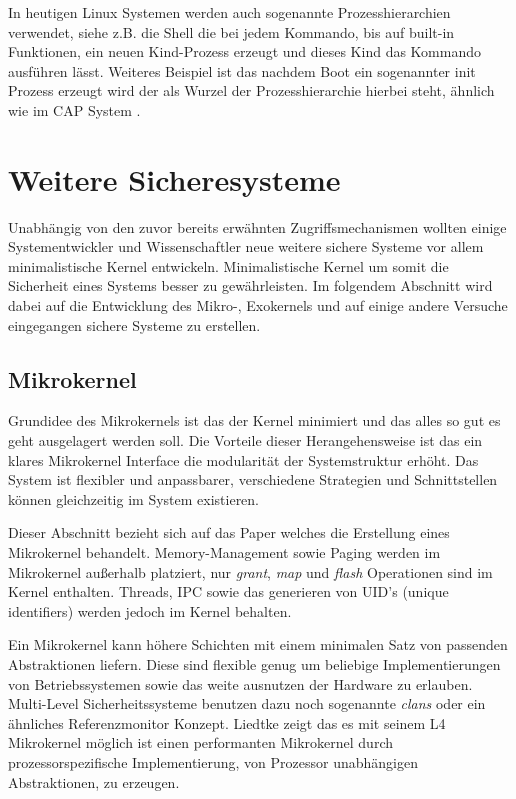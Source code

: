 \documentclass[11pt,technote]{IEEEtran}
\begin{document}
		     In heutigen Linux Systemen werden auch sogenannte Prozesshierarchien verwendet, siehe z.B. die Shell die bei jedem
		     Kommando, bis auf built-in Funktionen, ein neuen Kind-Prozess erzeugt und dieses Kind das Kommando ausf\"uhren l\"asst. Weiteres Beispiel
		     ist das nachdem Boot ein sogenannter init Prozess erzeugt wird der als Wurzel der Prozesshierarchie hierbei steht, \"ahnlich wie 
		     im CAP System \cite{Url:linux:processes}.
		     
  \section{Weitere Sicheresysteme} \label{sec:other}
    Unabh\"angig von den zuvor bereits erw\"ahnten Zugriffsmechanismen wollten einige Systementwickler und Wissenschaftler neue weitere sichere Systeme
    vor allem minimalistische Kernel entwickeln. Minimalistische Kernel um somit die Sicherheit eines Systems besser zu gew\"ahrleisten.
    Im folgendem Abschnitt wird dabei auf die Entwicklung des Mikro-, Exokernels und auf einige andere Versuche eingegangen sichere Systeme zu erstellen.
    \subsection{Mikrokernel}
	    Grundidee des Mikrokernels ist das der Kernel minimiert und das alles so gut es geht ausgelagert werden soll.
	    Die Vorteile dieser Herangehensweise ist das ein klares Mikrokernel Interface die modularit\"at der Systemstruktur erh\"oht.
	    Das System ist flexibler und anpassbarer, verschiedene Strategien und Schnittstellen k\"onnen gleichzeitig im System existieren.
	    
	    Dieser Abschnitt bezieht sich auf das Paper \cite{inproc:micro} welches die Erstellung eines Mikrokernel behandelt.
	    Memory-Management sowie Paging werden im Mikrokernel au\ss erhalb platziert, nur \textit{grant}, \textit{map} und \textit{flash} Operationen sind im Kernel 
	    enthalten. \cite[S. 238 f]{inproc:micro} Threads, IPC sowie das generieren von UID's (unique identifiers) werden jedoch im Kernel behalten.
	    
	    Ein Mikrokernel kann h\"ohere Schichten mit einem minimalen Satz von passenden Abstraktionen liefern.
	    Diese sind flexible genug um beliebige Implementierungen von Betriebssystemen sowie das weite ausnutzen der Hardware zu erlauben.
	    Multi-Level Sicherheitssysteme benutzen dazu noch sogenannte \textit{clans} oder ein \"ahnliches Referenzmonitor Konzept.        
	    Liedtke zeigt das es mit seinem L4 Mikrokernel m\"oglich ist einen performanten Mikrokernel durch prozessorspezifische Implementierung, 
	    von Prozessor unabh\"angigen Abstraktionen, zu erzeugen.\cite[S. 248]{inproc:micro}
   
\end{document}
